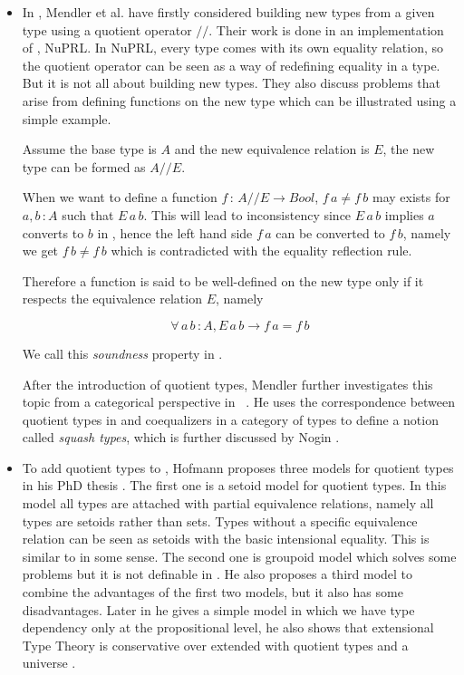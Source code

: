 \begin{itemize}

\item In \cite{cab}, Mendler et al. have firstly considered building new types from a
given type using a quotient operator $//$. Their work is done in an
implementation of \ett, NuPRL. 
In NuPRL, every type comes with its own equality relation, so the quotient operator can be
seen as a way of redefining equality in a type. But it is not all
about building new types. They also discuss problems that arise from
defining functions on the new type which can be illustrated using a simple example. 

Assume the base type is $A$ and the new equivalence relation is $E$, the new
type can be formed as $A//E$. 

When we want to define a function $f \,\colon\, A//E \to Bool$,  $f\,a \not= f\,b$ may
exists for $a, b \,\colon A$ such that $E\,a\,b$. This will lead to
inconsistency since $E\,a\,b$ implies $a$ converts to $b$ in \ett{}, hence
the left hand side $f\,a$ can be converted to $f\,b$, namely we get $f\,b \not= f\,b$
which is contradicted with the equality reflection rule. 

Therefore a function is said to be well-defined \cite{cab} on the new type only
if it respects the equivalence relation $E$, namely

$$\forall \, a\,b\,\colon A, E\,a\,b \to f\,a = f\,b$$

We call this \emph{soundness} property in \cite{aan}.

 After the introduction of quotient types, Mendler further investigates
 this topic from a categorical perspective in ~\cite{men:90}. He uses
 the correspondence between quotient types in \mltt{} and coequalizers
 in a category of types to define a notion called \emph{squash types},
 which is further discussed by Nogin \cite{nog:02}.

\item To add quotient types to \mltt{}, Hofmann proposes  three models for
quotient types in his PhD thesis \cite{hof:phd}. The first one is a setoid model for
quotient types. In this model all types are attached with partial
equivalence relations, namely all types are setoids rather than
sets. Types without a specific equivalence relation can be seen as
setoids with the basic intensional equality. This is similar to
\ett{} in some sense. The second one is groupoid model which solves some problems
but it is not definable in \itt{}. He also proposes a third model to
combine the advantages of the first two models, but it also has some
disadvantages. Later in \cite{hof:95:sm} he gives a simple model in which we have type dependency only at the propositional level, he also shows that extensional Type Theory is conservative over \itt  extended with quotient types and a universe \cite{hof:95:con}.


\end{itemize}
